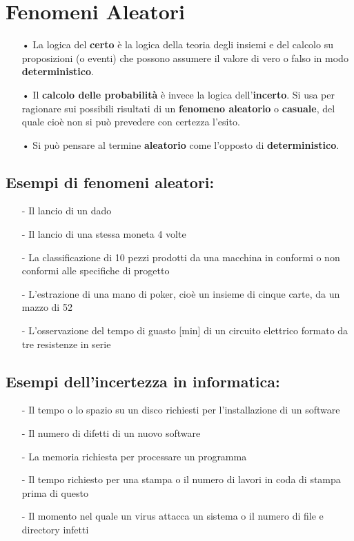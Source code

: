 \documentclass[12pt, letterpaper]{article}
\begin{document}
\section{Fenomeni Aleatori}
\begin{itemize}
   \item[•] La logica del \textbf{certo} è la logica della teoria degli insiemi e del calcolo
      su proposizioni (o eventi) che possono assumere il valore di vero o
      falso in modo \textbf{deterministico}. 
   \item[•] Il \textbf{calcolo delle probabilità} è invece la logica dell’\textbf{incerto}. Si usa per
      ragionare sui possibili risultati di un \textbf{fenomeno aleatorio} o \textbf{casuale},
      del quale cioè non si può prevedere con certezza l’esito.
   \item[•] Si può pensare al termine \textbf{aleatorio} come l’opposto di
      \textbf{deterministico}.
\end{itemize}

\subsection{Esempi di fenomeni aleatori:}
\begin{itemize}
   \item[-] Il lancio di un dado
   \item[-] Il lancio di una stessa moneta 4 volte
   \item[-] La classificazione di 10 pezzi prodotti da una macchina in conformi o
non conformi alle specifiche di progetto
\item[-] L’estrazione di una mano di poker, cioè un insieme di cinque carte, da
un mazzo di 52
      \item[-] L’osservazione del tempo di guasto [min] di un circuito elettrico
formato da tre resistenze in serie
\end{itemize}
\subsection{Esempi dell’incertezza in informatica:}
\begin{itemize}
   \item[-] Il tempo o lo spazio su un disco richiesti per l’installazione di un
software
\item[-] Il numero di difetti di un nuovo software
\item[-] La memoria richiesta per processare un programma
\item[-] Il tempo richiesto per una stampa o il numero di lavori in coda di
stampa prima di questo
\item[-] Il momento nel quale un virus attacca un sistema o il numero di file e
directory infetti
\end{itemize}
\end{document}
